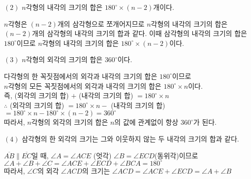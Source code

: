 \documentclass[a4paper]{oblivoir}
\begin{document}
\begin{flushleft}
    $(2)$ $n$각형의 내각의 크기의 합은 $180^{\circ} \times (n-2)$개이다.
\end{flushleft}

\begin{tcolorbox}[colback = skyblue!5!white, colframe = skyblue!99!black, title = \textmd{이해하기}]
    $n$각형은 $(n-2)$개의 삼각형으로 쪼개어지므로 $n$각형의 내각의 크기의 합은
    $(n-2)$개의 삼각형의 내각의 크기의 합과 같다. 이때 삼각형의 내각의 크기의 합은
    $180^{\circ}$이므로 $n$각형의 내각의 크기의 합은 $180^{\circ} \times (n-2)$이다.
\end{tcolorbox}

\begin{flushleft}
    $(3)$ $n$각형의 외각의 크기의 합은 $360^{\circ}$이다.
\end{flushleft}


\begin{tcolorbox}[colback = skyblue!5!white, colframe = skyblue!99!black, title = \textmd{이해하기}]
    다각형의 한 꼭짓점에서의 외각과 내각의 크기의 합은 $180^{\circ}$이므로 \\ $n$각형의 모든 꼭짓점에서의
    외각과 내각의 크기의 합은  $180^{\circ} \times n$이다. \\
    즉, (외각의 크기의 합) $+$ (내각의 크기의 합) $= 180^{\circ} \times n$ \\ 
    $\therefore$ (외각의 크기의 합) $= 180^{\circ} \times n -$ (내각의 크기의 합) \\
    $= 180^{\circ} \times n - 180^{\circ} \times (n-2) = 360^{\circ}$ \\
    따라서, $n$각형의 외각의 크기의 합은 $n$의 값에 관계없이 항상 $360^{\circ}$가 된다.
\end{tcolorbox}

\begin{flushleft}
    $(4)$ 삼각형의 한 외각의 크기는 그와 이웃하지 않는 두 내각의 크기의 합과 같다.
\end{flushleft}

\begin{tcolorbox}[colback = skyblue!5!white, colframe = skyblue!99!black, title = \textmd{이해하기}]
    $\overline{AB} \parallel \overline{EC}$일 때, $\angle A = \angle ACE$ (엇각) $\angle B = \angle ECD$(동위각)이므로\\ 
    $\angle A + \angle B + \angle C = \angle ACE + \angle ECD + \angle BCA = 180^{\circ}$ \\
    따라서, $\angle C$의 외각 $\angle ACD$의 크기는 $\angle ACD = \angle ACE + \angle ECD = \angle A + \angle B$
    
\end{tcolorbox}

\newpage
\end{document}

